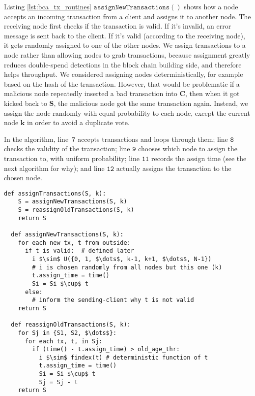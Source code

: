 Listing \ref{lst:bca_tx_routines} $\mathtt{assignNewTransactions()}$ shows how a node accepts an incoming transaction from a client and assigns it to another node.
The receiving node first checks if the transaction is valid. If it's invalid, an error message is sent back to the client. If it's valid (according to the receiving node), it gets randomly assigned to one of the other nodes.
We assign transactions to a node rather than allowing nodes to grab transactions, because assignment greatly reduces double-spend detections in the block chain building side, and therefore helps throughput.
We considered assigning nodes deterministically, for example based on the hash of the transaction.
However, that would be problematic if a malicious node repeatedly inserted a bad transaction into $\mathbf{C}$, then when it got kicked back to $\mathbf{S}$, the malicious node got the same transaction again.
Instead, we assign the node randomly with equal probability to each node, except the current node $\mathbf{k}$ in order to avoid a duplicate vote.

In the algorithm, line~$\mathtt{7}$ accepts transactions and loops through them; line $\mathtt{8}$ checks the validity of the transaction; line $\mathtt{9}$ chooses which node to assign the transaction to, with uniform probability; line $\mathtt{11}$ records the assign time (see the next algorithm for why); and line $\mathtt{12}$ actually assigns the transaction to the chosen node.

\begin{minipage}{\linewidth}
  \begin{lstlisting}[caption={Routines for accepting and assigning transactions.}, label={lst:bca_tx_routines}, style=python, mathescape=true]
  def assignTransactions(S, k):
    S = assignNewTransactions(S, k) 
    S = reassignOldTransactions(S, k) 
    return S 
    
  def assignNewTransactions(S, k): 
    for each new tx, t from outside: 
      if t is valid:  # defined later
        i $\sim$ U({0, 1, $\dots$, k-1, k+1, $\dots$, N-1})
        # i is chosen randomly from all nodes but this one (k) 
        t.assign_time = time() 
        Si = Si $\cup$ t
      else:
        # inform the sending-client why t is not valid 
    return S 
    
  def reassignOldTransactions(S, k): 
    for Sj in {S1, S2, $\dots$}: 
      for each tx, t, in Sj: 
        if (time() - t.assign_time) > old_age_thr:
          i $\sim$ findex(t) # deterministic function of t
          t.assign_time = time()
          Si = Si $\cup$ t
          Sj = Sj - t
    return S
  \end{lstlisting}
\end{minipage}

